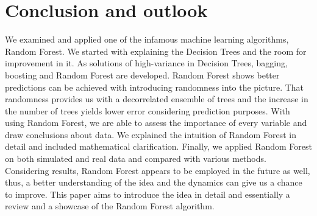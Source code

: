 \section{Conclusion and outlook}

We examined and applied one of the infamous machine learning algorithms, Random Forest. 
We started with explaining the Decision Trees and the room for improvement in it. 
As solutions of high-variance in Decision Trees, bagging, boosting and Random Forest are developed. 
Random Forest shows better predictions can be achieved with introducing randomness into the picture.
That randomness provides us with a decorrelated ensemble of trees and 
the increase in the number of trees yields lower error considering prediction purposes.
With using Random Forest, we are able to assess the importance of every variable and draw conclusions about data.
We explained the intuition of Random Forest in detail and included mathematical clarification. 
Finally, we applied Random Forest on both simulated and real data and compared with various methods. 
Considering results, Random Forest appears to be employed in the future as well, 
thus, a better understanding of the idea and the dynamics can give us a chance to improve. 
This paper aims to introduce the idea in detail and essentially a review and a showcase of the Random Forest algorithm. 